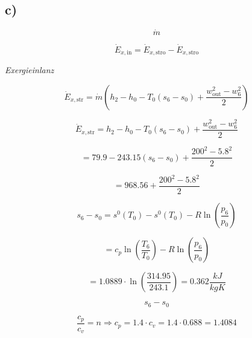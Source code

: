 

\subsection*{c)}

\begin{equation*}
\dot{m}
\end{equation*}

\begin{equation*}
\dot{E}_{x, \text{in}} = \dot{E}_{x, \text{stro}} - \dot{E}_{x, \text{stro}}
\end{equation*}

\textit{Exergieinlanz}

\begin{equation*}
\dot{E}_{x, \text{str}} = \dot{m} \left( h_2 - h_0 - T_0 (s_6 - s_0) + \frac{w_{\text{out}}^2 - w_6^2}{2} \right)
\end{equation*}

\begin{equation*}
\dot{E}_{x, \text{str}} = h_2 - h_0 - T_0 (s_6 - s_0) + \frac{w_{\text{out}}^2 - w_6^2}{2}
\end{equation*}

\begin{equation*}
= 79.9 - 243.15 (s_6 - s_0) + \frac{200^2 - 5.8^2}{2}
\end{equation*}

\begin{equation*}
= 968.56 + \frac{200^2 - 5.8^2}{2}
\end{equation*}

\begin{equation*}
s_6 - s_0 = s^0 (T_0) - s^0 (T_0) - R \ln \left( \frac{p_6}{p_0} \right)
\end{equation*}

\begin{equation*}
= c_p \ln \left( \frac{T_6}{T_0} \right) - R \ln \left( \frac{p_6}{p_0} \right)
\end{equation*}

\begin{equation*}
= 1.0889 \cdot \ln \left( \frac{314.95}{243.1} \right) = 0.362 \frac{kJ}{kgK}
\end{equation*}

\begin{equation*}
s_6 - s_0
\end{equation*}

\begin{equation*}
\frac{c_p}{c_v} = n \Rightarrow c_p = 1.4 \cdot c_v = 1.4 \cdot 0.688 = 1.4084
\end{equation*}